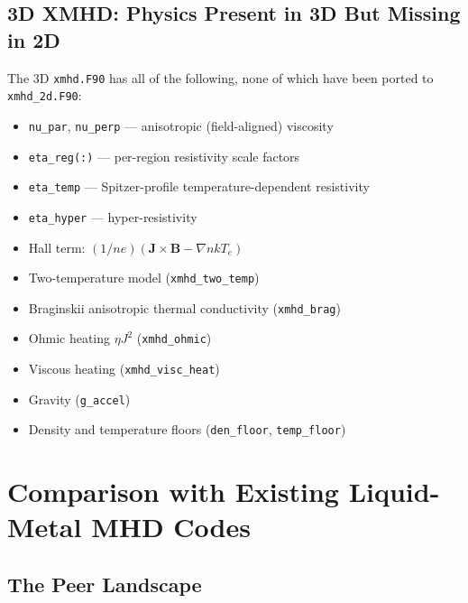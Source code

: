 \documentclass[11pt,letterpaper]{article}
\begin{document}
\subsection{3D XMHD: Physics Present in 3D But Missing in 2D}

The 3D \texttt{xmhd.F90} has all of the following, none of which have been
ported to \texttt{xmhd\_2d.F90}:

\begin{itemize}
  \item \texttt{nu\_par}, \texttt{nu\_perp} --- anisotropic (field-aligned) viscosity
  \item \texttt{eta\_reg(:)} --- per-region resistivity scale factors
  \item \texttt{eta\_temp} --- Spitzer-profile temperature-dependent resistivity
  \item \texttt{eta\_hyper} --- hyper-resistivity
  \item Hall term: $(1/ne)(\mathbf{J}\times\mathbf{B} - \nabla nkT_e)$
  \item Two-temperature model (\texttt{xmhd\_two\_temp})
  \item Braginskii anisotropic thermal conductivity (\texttt{xmhd\_brag})
  \item Ohmic heating $\eta J^2$ (\texttt{xmhd\_ohmic})
  \item Viscous heating (\texttt{xmhd\_visc\_heat})
  \item Gravity (\texttt{g\_accel})
  \item Density and temperature floors (\texttt{den\_floor}, \texttt{temp\_floor})
\end{itemize}

\section{Comparison with Existing Liquid-Metal MHD Codes}

\subsection{The Peer Landscape}
\end{document}

